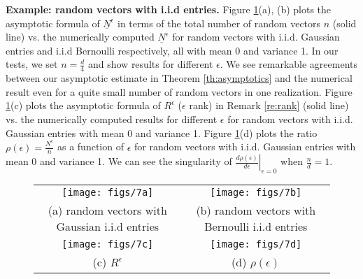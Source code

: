 \documentclass[11pt]{amsart}
\begin{document}
{\bf Example: random vectors with i.i.d entries.} Figure \ref{fig:iid}(a), (b) plots the asymptotic formula of $\underline{N}^{\epsilon}$ in terms of the total number of random vectors $n$ (solid line) vs. the numerically computed $\underline{N}^{\epsilon}$ for random vectors with i.i.d. Gaussian entries and i.i.d Bernoulli respectively, all with mean 0 and variance 1. In our tests, we set $n=\frac{d}{4}$ and show results for different $\epsilon$. We see remarkable agreements between our asymptotic estimate in Theorem \ref{th:asymptotics} and the numerical result even for a quite small number of random vectors in one realization. Figure \ref{fig:iid}(c) plots the asymptotic formula of $R^{\epsilon}$ ($\epsilon$ rank) in Remark \ref{re:rank} (solid line) vs. the numerically computed results for different $\epsilon$ for random vectors with i.i.d. Gaussian entries with mean 0 and variance 1. Figure \ref{fig:iid}(d) plots the ratio $\rho(\epsilon)=\frac{\underline{N}^{\epsilon}}{n}$ as a function of $\epsilon$ for random vectors with i.i.d. Gaussian entries with mean 0 and variance 1. We can see the singularity of $\left.\frac{d\rho(\epsilon)}{d\epsilon}\right|_{\epsilon=0}$ when $\frac{n}{d}=1$.
\begin{figure}[htb]
\begin{center}
\begin{tabular}{cc}
\texttt{[image: figs/7a]} & \texttt{[image: figs/7b]}
\\
(a) random vectors with Gaussian i.i.d entries & (b) random vectors with Bernoulli i.i.d entries
\\
\texttt{[image: figs/7c]}  & \texttt{[image: figs/7d]} 
\\
(c) $R^{\epsilon}$ & (d) $\rho(\epsilon)$
\end{tabular}
\end{center}
\caption{}
\label{fig:iid}
\end{figure}
\end{document}
